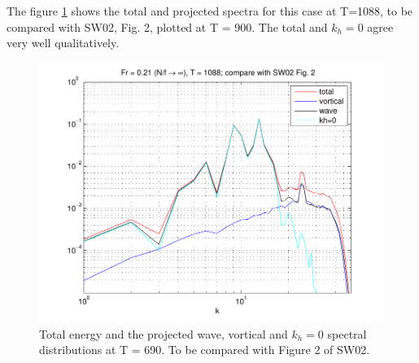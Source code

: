 \documentclass[12pt]{article}
\begin{document}
The figure \ref{Froude_spec} shows the total and projected spectra for
this case at T=1088, to be compared with SW02, Fig. 2, plotted at T = 900.
The total and $k_h=0$ agree very well qualitatively.
\begin{figure}[ht]
\centering
  \includegraphics[scale = 0.7]{Comp_SW02_fig2}
  \caption{Total energy and the projected wave, vortical and $k_h=0$
    spectral distributions at T = 690. To be compared with Figure 2 of
    SW02. \label{Froude_spec}}
\end{figure}
\end{document}
